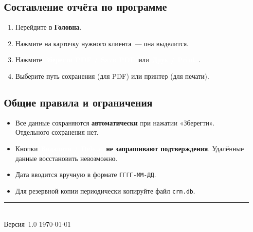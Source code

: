 \documentclass[12pt,a4paper]{article}
\newcommand{\btn}[2][primary]{%
  \textcolor{white}{\colorbox{#1}{\small\bfseries\,#2\,}}%
}
\newcommand{\btnred}[1]{\btn[danger]{#1}}
\begin{document}
\subsection{Составление отчёта по программе}

\begin{enumerate}
  \item Перейдите в \textbf{Головна}.
  \item Нажмите на карточку нужного клиента~--- она выделится.
  \item Нажмите \btn{Зберегти PDF / Save PDF} или
    \btn[success!70!black]{Друк / Print}.
  \item Выберите путь сохранения (для PDF) или принтер (для печати).
\end{enumerate}

\subsection{Общие правила и ограничения}

\begin{itemize}
  \item Все данные сохраняются \textbf{автоматически} при нажатии
    «Зберегти». Отдельного сохранения нет.
  \item Кнопки \btnred{Видалити / Delete} \textbf{не запрашивают
    подтверждения}. Удалённые данные восстановить невозможно.
  \item Дата вводится вручную в формате \texttt{ГГГГ-ММ-ДД}.
  \item Для резервной копии периодически копируйте файл \texttt{crm.db}.
\end{itemize}

\vfill
\begin{center}
  \rule{0.5\textwidth}{0.4pt}\\[4pt]
  {\small Версия~1.0 \quad \today}
\end{center}
\end{document}
